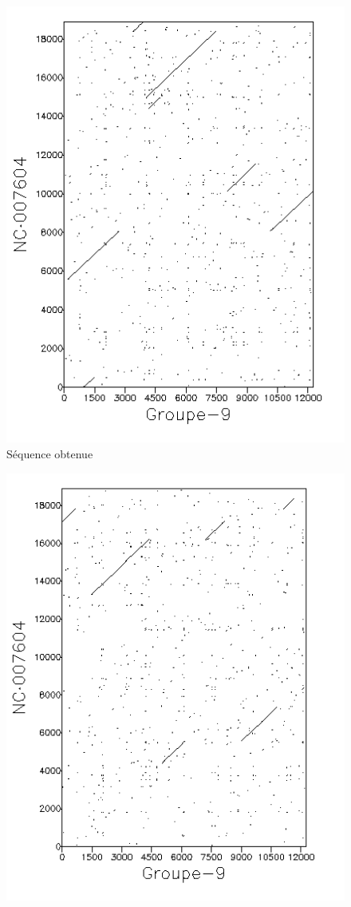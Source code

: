 \begin{figure}[!ht]
	\begin{minipage}[r]{.46\linewidth}
		\begin{center}
		\includegraphics[scale= 0.7]{../res/cible5.png}
Séquence obtenue	\end{center}
\end{minipage} \hfill
\begin{minipage}[c]{.46 \linewidth}
	\begin{center}
			\includegraphics[scale= 0.7]{../res/cible5-ic.png}

\end{center}
\end{minipage}
\end{figure}
